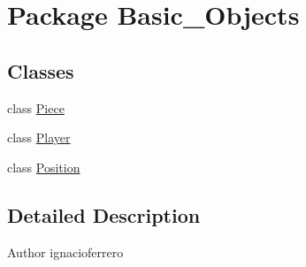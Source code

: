 \hypertarget{namespace_basic___objects}{\section{Package Basic\-\_\-\-Objects}
\label{namespace_basic___objects}
}
\subsection*{Classes}
\begin{DoxyCompactItemize}
\item 
class \hyperlink{class_basic___objects_1_1_piece}{Piece}
\item 
class \hyperlink{class_basic___objects_1_1_player}{Player}
\item 
class \hyperlink{class_basic___objects_1_1_position}{Position}
\end{DoxyCompactItemize}


\subsection{Detailed Description}
\begin{DoxyAuthor}{Author}
ignacioferrero 
\end{DoxyAuthor}
